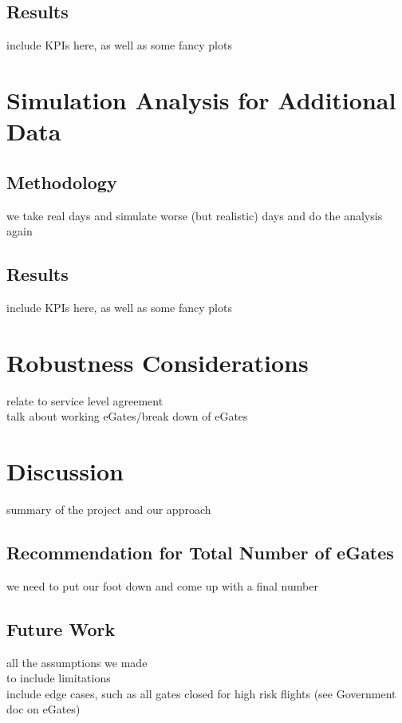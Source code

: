 \documentclass[10pt]{article}
\begin{document}
\subsection{Results}
include KPIs here, as well as some fancy plots


\section{Simulation Analysis for Additional Data}

\subsection{Methodology}
we take real days and simulate worse (but realistic) days and do the analysis again

\subsection{Results}
include KPIs here, as well as some fancy plots


\section{Robustness Considerations}
relate to service level agreement \\
talk about working eGates/break down of eGates  \\

\section{Discussion}
summary of the project and our approach


\subsection{Recommendation for Total Number of eGates}
we need to put our foot down and come up with a final number

\subsection{Future Work}
all the assumptions we made \\
to include limitations \\
include edge cases, such as all gates closed for high risk flights (see Government doc on eGates) 


\end{document}
